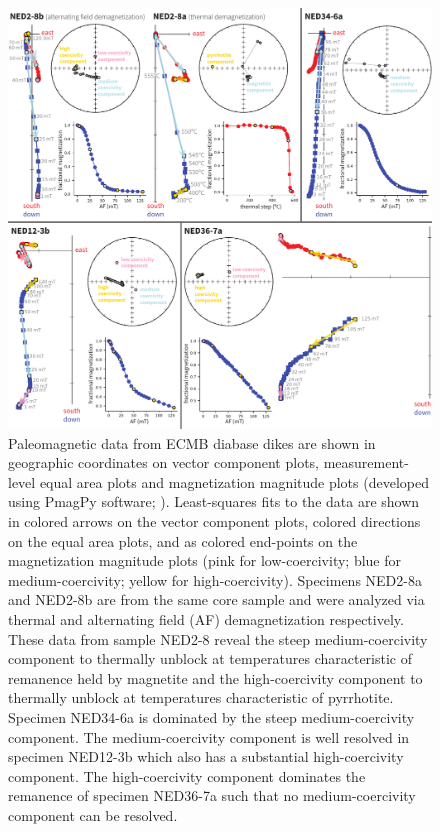 \documentclass[draft]{agujournal2019}
\begin{document}
\begin{figure}[!ht]
\noindent\includegraphics[width=\textwidth]{./figures/paleomag_data.pdf}
\caption{\small{Paleomagnetic data from ECMB diabase dikes are shown in geographic coordinates on vector component plots, measurement-level equal area plots and magnetization magnitude plots (developed using PmagPy software; ). Least-squares fits to the data are shown in colored arrows on the vector component plots, colored directions on the equal area plots, and as colored end-points on the magnetization magnitude plots (pink for low-coercivity; blue for medium-coercivity; yellow for high-coercivity). Specimens NED2-8a and NED2-8b are from the same core sample and were analyzed via thermal and alternating field (AF) demagnetization respectively. These data from sample NED2-8 reveal the steep medium-coercivity component to thermally unblock at temperatures characteristic of remanence held by magnetite and the high-coercivity component to thermally unblock at temperatures characteristic of pyrrhotite. Specimen NED34-6a is dominated by the steep medium-coercivity component. The medium-coercivity component is well resolved in specimen NED12-3b which also has a substantial high-coercivity component. The high-coercivity component dominates the remanence of specimen NED36-7a such that no medium-coercivity component can be resolved.}}
\label{fig:example_pmag}
\end{figure}
\end{document}

